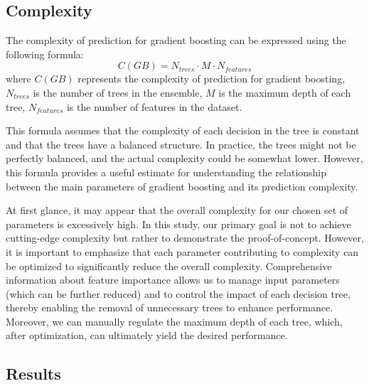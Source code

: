 \subsection{Complexity}
The complexity of prediction for gradient boosting can be expressed using the following formula:
$$
C(GB) = N_{trees} \cdot M \cdot N_{features}
$$
where $C(GB)$ represents the complexity of prediction for gradient boosting, $N_{trees}$ is the number of trees in the ensemble, $M$ is the maximum depth of each tree, $N_{features}$ is the number of features in the dataset.

This formula assumes that the complexity of each decision in the tree is constant and that the trees have a balanced structure. In practice, the trees might not be perfectly balanced, and the actual complexity could be somewhat lower. However, this formula provides a useful estimate for understanding the relationship between the main parameters of gradient boosting and its prediction complexity.

At first glance, it may appear that the overall complexity for our chosen set of parameters is excessively high. In this study, our primary goal is not to achieve cutting-edge complexity but rather to demonstrate the proof-of-concept. However, it is important to emphasize that each parameter contributing to complexity can be optimized to significantly reduce the overall complexity. Comprehensive information about feature importance allows us to manage input parameters (which can be further reduced) and to control the impact of each decision tree, thereby enabling the removal of unnecessary trees to enhance performance. Moreover, we can manually regulate the maximum depth of each tree, which, after optimization, can ultimately yield the desired performance.


\subsection{Results}

